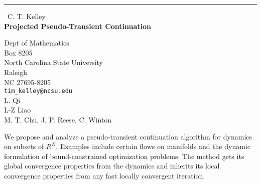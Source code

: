 \documentclass{report}
\begin{document}
\begin{center}
\rule{6in}{1pt} \
{\large C. T. Kelley \\
{\bf Projected Pseudo-Transient Continuation}}

Dept of Mathematics \\ Box 8205 \\ North Carolina State University \\ Raleigh \\ NC 27695-8205
\\
{\tt tim_kelley@ncsu.edu}\\
L. Qi\\
L-Z Liao\\
	M. T. Chu, J. P. Reese, C. Winton\end{center}

We propose and analyze a pseudo-transient continuation algorithm for
dynamics on subsets of $R^N$. Examples include certain
flows on manifolds and the dynamic formulation of bound-constrained
optimization problems. The method gets its global convergence properties
from the dynamics and inherits its local convergence properties from
any fast locally convergent iteration.
\end{document}

